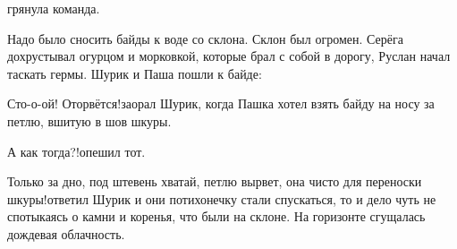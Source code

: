 \mdash грянула команда.

Надо было сносить байды к воде со склона. Склон был огромен. Серёга дохрустывал огурцом и морковкой, которые брал с собой в дорогу, Руслан начал таскать гермы. Шурик и Паша пошли к байде:

\diagdash Сто-о-ой! Оторвётся!\mdash заорал Шурик, когда Пашка хотел взять байду на носу за петлю, вшитую в шов шкуры.

\diagdash А как тогда?!\mdash опешил тот.

\diagdash Только за дно, под штевень хватай, петлю вырвет, она чисто для переноски шкуры!\mdash ответил Шурик и они потихонечку стали спускаться, то и дело чуть не спотыкаясь о камни и коренья, что были на склоне. На горизонте сгущалась дождевая облачность.






\begin{center}
\end{center}
